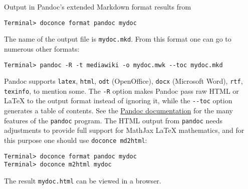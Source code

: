 \documentclass[%
oneside,                 %
final,                   %
10pt]{article}
\begin{document}
Output in Pandoc's extended Markdown format results from
\vspace{4pt}
\begin{Verbatim}[numbers=none,frame=lines,label=\fbox{{\tiny Terminal}},fontsize=\fontsize{9pt}{9pt},
labelposition=topline,framesep=2.5mm,framerule=0.7pt]
Terminal> doconce format pandoc mydoc
\end{Verbatim}
The name of the output file is {\fontsize{10pt}{10pt}\Verb!mydoc.mkd!}.
From this format one can go to numerous other formats:
\vspace{4pt}
\begin{Verbatim}[numbers=none,frame=lines,label=\fbox{{\tiny Terminal}},fontsize=\fontsize{9pt}{9pt},
labelposition=topline,framesep=2.5mm,framerule=0.7pt]
Terminal> pandoc -R -t mediawiki -o mydoc.mwk --toc mydoc.mkd
\end{Verbatim}
Pandoc supports {\fontsize{10pt}{10pt}\Verb!latex!}, {\fontsize{10pt}{10pt}\Verb!html!}, {\fontsize{10pt}{10pt}\Verb!odt!} (OpenOffice), {\fontsize{10pt}{10pt}\Verb!docx!} (Microsoft
Word), {\fontsize{10pt}{10pt}\Verb!rtf!}, {\fontsize{10pt}{10pt}\Verb!texinfo!}, to mention some. The {\fontsize{10pt}{10pt}\Verb!-R!} option makes
Pandoc pass raw HTML or {\LaTeX} to the output format instead of ignoring it,
while the {\fontsize{10pt}{10pt}\Verb!--toc!} option generates a table of contents.
See the \href{{http://johnmacfarlane.net/pandoc/README.html}}{Pandoc documentation}
for the many features of the {\fontsize{10pt}{10pt}\Verb!pandoc!} program. The HTML output from
{\fontsize{10pt}{10pt}\Verb!pandoc!} needs adjustments to provide full support for MathJax {\LaTeX}
mathematics, and for this purpose one should use {\fontsize{10pt}{10pt}\Verb!doconce md2html!}:

\vspace{4pt}
\begin{Verbatim}[numbers=none,frame=lines,label=\fbox{{\tiny Terminal}},fontsize=\fontsize{9pt}{9pt},
labelposition=topline,framesep=2.5mm,framerule=0.7pt]
Terminal> doconce format pandoc mydoc
Terminal> doconce m2html mydoc
\end{Verbatim}
The result {\fontsize{10pt}{10pt}\Verb!mydoc.html!} can be viewed in a browser.
\end{document}
